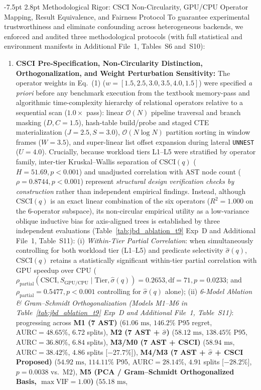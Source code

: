 \documentclass[10pt,a4paper]{article}
\makeatletter
\renewcommand\subsection{\@startsection{subsection}{2}{\z@}%
  {-7.5pt \@plus -2pt \@minus -1pt}%
  {2.8pt \@plus 1pt}%
  {\normalfont\normalsize\bfseries}}
\makeatother
\begin{document}
\subsection{Methodological Rigor: CSCI Non-Circularity, GPU/CPU Operator Mapping, Result Equivalence, and Fairness Protocol}
To guarantee experimental trustworthiness and eliminate confounding across heterogeneous backends, we enforced and audited three methodological protocols (with full statistical and environment manifests in Additional File~1, Tables~S6 and~S10):
\begin{enumerate}[leftmargin=1.5em,itemsep=0.8pt]
    \item \textbf{CSCI Pre-Specification, Non-Circularity Distinction, Orthogonalization, and Weight Perturbation Sensitivity:} The operator weights in Eq.~(1) ($w = [1.5, 2.5, 3.0, 3.5, 4.0, 1.5]$) were specified \emph{a priori} before any benchmark execution from the textbook memory-pass and algorithmic time-complexity hierarchy of relational operators relative to a sequential scan ($1.0\times$ pass): linear $\mathcal{O}(N)$ pipeline traversal and branch masking ($D, C = 1.5$), hash-table build/probe and staged CTE materialization ($J = 2.5, S = 3.0$), $\mathcal{O}(N \log N)$ partition sorting in window frames ($W = 3.5$), and super-linear list offset expansion during lateral \texttt{UNNEST} ($U = 4.0$). Crucially, because workload tiers L1--L5 were stratified by operator family, inter-tier Kruskal--Wallis separation of $\text{CSCI}(q)$ ($H = 51.69, p < 0.001$) and unadjusted correlation with AST node count ($\rho = 0.8744, p < 0.001$) represent \emph{structural design verification checks by construction} rather than independent empirical findings. Instead, although $\text{CSCI}(q)$ is an exact linear combination of the six operators ($R^2=1.000$ on the 6-operator subspace), its non-circular empirical utility as a low-variance oblique inductive bias for axis-aligned trees is established by three independent evaluations (Table~\ref{tab:jbd_ablation_t9} Exp~D and Additional File~1, Table~S11): (i) \emph{Within-Tier Partial Correlation}: when simultaneously controlling for both workload tier (L1--L5) and predicate selectivity $\hat{\sigma}(q)$, $\text{CSCI}(q)$ retains a statistically significant within-tier partial correlation with GPU speedup over CPU ($\rho_{\text{partial}}(\text{CSCI}, S_{\text{GPU/CPU}} \mid \text{Tier}, \hat{\sigma}(q)) = 0.2653, \text{df}=71, p = 0.0233$; and $\rho_{\text{partial}} = 0.5477, p < 0.001$ controlling for $\hat{\sigma}(q)$ alone); (ii) \emph{6-Model Ablation \& Gram--Schmidt Orthogonalization (Models M1--M6 in Table~\ref{tab:jbd_ablation_t9} Exp~D and Additional File~1, Table~S11)}: progressing across \textbf{M1 (7 AST)} ($61.06\text{ ms}$, $146.2\%$ P95 regret, $\text{AURC}=48.65\%$, $6.72$ splits), \textbf{M2 (7 AST + $\hat{\sigma}$)} ($58.12\text{ ms}$, $138.45\%$ P95, $\text{AURC}=36.80\%$, $6.84$ splits), \textbf{M3/M0 (7 AST + CSCI)} ($58.94\text{ ms}$, $\text{AURC}=38.42\%$, $4.86$ splits [$-27.7\%$]), \textbf{M4/M3 (7 AST + $\hat{\sigma}$ + CSCI Proposed)} ($54.92\text{ ms}$, $114.11\%$ P95, $\text{AURC}=28.14\%$, $4.91$ splits [$-28.2\%$], $p=0.0038$ vs.\ M2), \textbf{M5 (PCA / Gram--Schmidt Orthogonalized Basis, $\max\text{VIF}=1.00$)} ($55.18\text{ ms}$, 
\end{enumerate}
\end{document}
